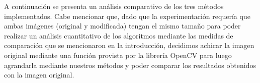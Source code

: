 A continuación se presenta un análisis comparativo de los tres métodos implementados.
Cabe mencionar que, dado que la experimentación requería que ambas imágenes (original y modificada) tengan el mismo tamaño para poder realizar un análisis cuantitativo de los algoritmos mediante las medidas de comparación que se mencionaron en la introducción, decidimos achicar la imagen original mediante una función provista por la librería OpenCV para luego agrandarla mediante nuestros métodos y poder comparar los resultados obtenidos con la imagen original.